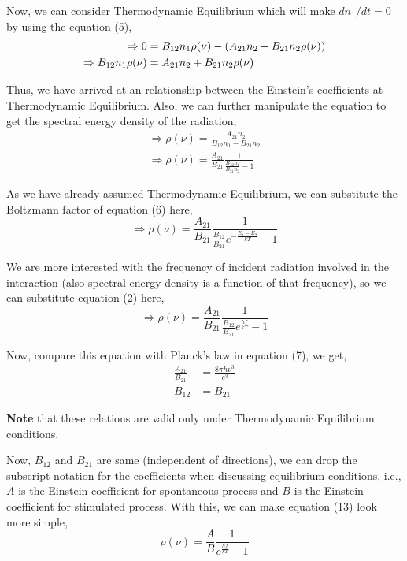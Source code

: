 \documentclass[12pt]{article}
\begin{document}
Now, we can consider Thermodynamic Equilibrium which will make $dn_{1}/dt = 0$ by using the equation (5), 
\begin{align}
    \Rightarrow 0 & = B_{12}n_{1}\rho(\nu) - (A_{21}n_{2} + B_{21}n_{2}\rho(\nu)) \notag \\
    \Rightarrow B_{12}n_{1}\rho(\nu) & = A_{21}n_{2} + B_{21}n_{2}\rho(\nu)
\end{align}

Thus, we have arrived at an relationship between the Einstein's coefficients at Thermodynamic Equilibrium. 
Also, we can further manipulate the equation to get the spectral energy density of the radiation,
\begin{align*}
    \Rightarrow \rho(\nu) = \frac{A_{21}n_{2}}{B_{12}n_{1} - B_{21}n_{2}} \\
    \Rightarrow \rho(\nu) = \frac{A_{21}}{B_{21}} \frac{1}{\frac{B_{12}n_{1}}{B_{21}n_{2}} - 1}
\end{align*}

As we have already assumed Thermodynamic Equilibrium, we can substitute the Boltzmann factor of equation (6) here,
\begin{equation*}
    \Rightarrow \rho(\nu) = \frac{A_{21}}{B_{21}} \frac{1}{\frac{B_{12}}{B_{21}} e^{-\frac{E_{1} - E_{2}}{kT}} - 1}
\end{equation*} \vspace{.2cm}

We are more interested with the frequency of incident radiation involved in the interaction (also spectral energy density is a function of that frequency), so we can substitute equation (2) here,
\begin{equation}
    \Rightarrow \rho(\nu) = \frac{A_{21}}{B_{21}} \frac{1}{\frac{B_{12}}{B_{21}} e^{\frac{hf}{kT}} - 1}
\end{equation}

Now, compare this equation with Planck's law in equation (7), we get,
\begin{align}
    \frac{A_{21}}{B_{21}} & = \frac{8\pi h \nu^3}{c^3} \\
    B_{12} & = B_{21}
\end{align}

\textbf{Note} that these relations are valid only under Thermodynamic Equilibrium conditions. \vspace{.2cm}

Now, $B_{12}$ and $B_{21}$ are same (independent of directions), we can drop the subscript notation for the coefficients when discussing equilibrium conditions, i.e., $A$ is the Einstein coefficient for spontaneous process and $B$ is the Einstein coefficient for stimulated process. With this, we can make equation (13) look more simple,
\begin{equation*}
    \rho(\nu) = \frac{A}{B} \frac{1}{e^{\frac{hf}{kT}} - 1}
\end{equation*} 
\end{document}
